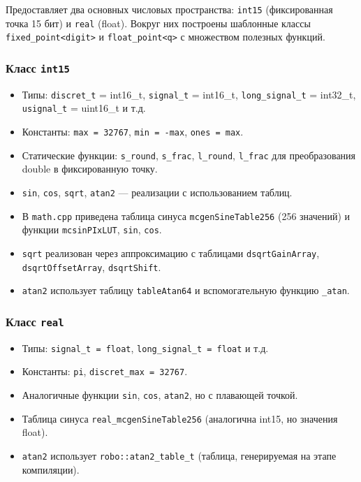 \documentclass[a4paper,12pt]{article}
\begin{document}
Предоставляет два основных числовых пространства: \texttt{int15} (фиксированная точка 15 бит) и \texttt{real} (float). Вокруг них построены шаблонные классы \texttt{fixed\_point<digit>} и \texttt{float\_point<q>} с множеством полезных функций.

\subsubsection{Класс \texttt{int15}}

\begin{itemize}
    \item Типы: \texttt{discret\_t} = int16\_t, \texttt{signal\_t} = int16\_t, \texttt{long\_signal\_t} = int32\_t, \texttt{usignal\_t} = uint16\_t и т.д.
    \item Константы: \texttt{max = 32767}, \texttt{min = -max}, \texttt{ones = max}.
    \item Статические функции: \texttt{s\_round}, \texttt{s\_frac}, \texttt{l\_round}, \texttt{l\_frac} для преобразования double в фиксированную точку.
    \item \texttt{sin}, \texttt{cos}, \texttt{sqrt}, \texttt{atan2} — реализации с использованием таблиц.
    \item В \texttt{math.cpp} приведена таблица синуса \texttt{mcgenSineTable256} (256 значений) и функции \texttt{mcsinPIxLUT}, \texttt{sin}, \texttt{cos}.
    \item \texttt{sqrt} реализован через аппроксимацию с таблицами \texttt{dsqrtGainArray}, \texttt{dsqrtOffsetArray}, \texttt{dsqrtShift}.
    \item \texttt{atan2} использует таблицу \texttt{tableAtan64} и вспомогательную функцию \texttt{\_atan}.
\end{itemize}

\subsubsection{Класс \texttt{real}}

\begin{itemize}
    \item Типы: \texttt{signal\_t = float}, \texttt{long\_signal\_t = float} и т.д.
    \item Константы: \texttt{pi}, \texttt{discret\_max = 32767}.
    \item Аналогичные функции \texttt{sin}, \texttt{cos}, \texttt{atan2}, но с плавающей точкой.
    \item Таблица синуса \texttt{real\_mcgenSineTable256} (аналогична int15, но значения float).
    \item \texttt{atan2} использует \texttt{robo::atan2\_table\_t} (таблица, генерируемая на этапе компиляции).
\end{itemize}
\end{document}
